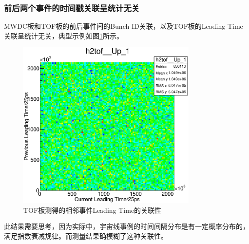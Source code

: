 \subsubsection*{前后两个事件的时间戳关联呈统计无关}
MWDC板和TOF板的前后事件间的Bunch ID关联，以及TOF板的Leading Time关联呈统计无关，典型示例如图\ref{fig:tof_leadingtime_current_vs_previous}所示。
\begin{figure}[H]
	\centering
	\includegraphics[width=0.8\textwidth]{fig/tof_leadingtime_current_vs_previous.eps}
	\caption{TOF板测得的相邻事件Leading Time的关联性}
	\label{fig:tof_leadingtime_current_vs_previous}
\end{figure}
此结果需要思考，因为实际中，宇宙线事例的时间间隔分布是有一定概率分布的，满足指数衰减规律。而测量结果确模糊了这种关联性。

